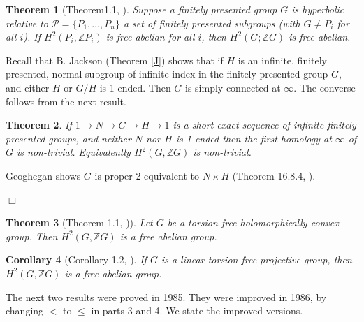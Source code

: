 \documentclass[12pt]{article}
\newtheorem{theorem}{Theorem}[subsection]
\newtheorem{corollary}[theorem]{Corollary}
\newenvironment{proof}{\addvspace{12pt}\noindent{\bf Proof:}}{
$\Box$\par\addvspace{12pt}}
\begin{document}
 \begin{theorem} [Theorem1.1, \cite{MS19}] \label{HomRH} 
Suppose a finitely presented group $G$ is hyperbolic relative to $\mathcal P=\{P_1,\ldots ,P_n\}$ a set of 
finitely presented  subgroups (with $G\ne P_i$ for all $i$). If $H^2(P_i,\mathbb ZP_i)$ is free abelian for all $i$, then  $H^2(G;\mathbb ZG)$ is free abelian.
\end{theorem} 

Recall that B. Jackson (Theorem \ref{J}) shows that  if $H$ is an infinite, finitely presented, normal subgroup of infinite index in the finitely presented group $G$, and either $H$ or $G/H$ is 1-ended. Then $G$ is simply connected at $\infty$. The converse follows from the next result. 

\begin{theorem} \label{Proper2exact} 
If $1\to N\to G\to H\to 1$ is a short exact sequence of infinite finitely presented groups, and neither $N$ nor $H$ is 1-ended then the first homology at $\infty$ of $G$ is non-trivial. Equivalently $H^2(G,\mathbb ZG)$ is non-trivial. 
\end{theorem}
\begin{proof}
Geoghegan shows $G$ is proper 2-equivalent to $N\times H$ (Theorem 16.8.4, \cite{G}). 
\end{proof}

\begin{theorem} [Theorem 1.1, \cite{BM17})] \label{Holo}
Let $G$ be a torsion-free holomorphically convex group. Then $H^2(G,\mathbb ZG)$ is a free abelian group.
\end{theorem}

\begin{corollary} [Corollary 1.2, \cite{BM17}] \label{Proj} 
If $G$ is a linear torsion-free projective group, then $H^2(G,\mathbb ZG)$ is a free abelian group.
\end{corollary}


The next two results were proved in 1985. They were improved in 1986, by changing $<$ to $\leq$ in parts 3 and 4. We state the improved versions. 
\end{document}
